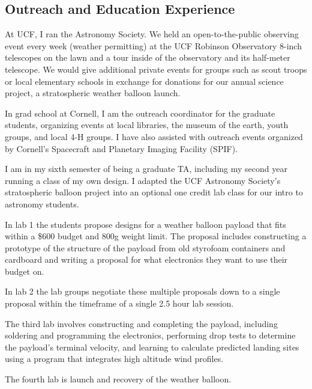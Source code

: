 \documentclass[preprint]{aastex}
\begin{document}
\begin{multicols}{2}
\vspace{-3mm}
\subsection*{Outreach and Education Experience}
\vspace{-3mm}

At UCF, I ran the Astronomy Society. We held an open-to-the-public observing
event every week (weather permitting) at the UCF Robinson Observatory 8-inch
telescopes on the lawn and a tour inside of the observatory and its half-meter
telescope. We would give additional private events for groups such as scout
troops or local elementary schools in exchange for donations for our annual
science project, a stratospheric weather balloon launch.

In grad school at Cornell, I am the outreach coordinator for the graduate
students, organizing events at local libraries, the museum of the earth,
youth groups, and local 4-H groups. I have also assisted with outreach events
organized by Cornell's Spacecraft and Planetary Imaging Facility (SPIF).

I am in my sixth semester of being a graduate TA, including my second year
running a class of my own design. I adapted the UCF Astronomy Society's
stratospheric balloon project into an optional one credit lab class for our
intro to astronomy students.

In lab 1 the students propose designs for a weather balloon payload that fits
within a \$600 budget and 800g weight limit. The proposal includes constructing
a prototype of the structure of the payload from old styrofoam containers and
cardboard and writing a proposal for what electronics they want to use their
budget on.

In lab 2 the lab groups negotiate these multiple proposals down to a single
proposal within the timeframe of a single 2.5 hour lab session.

The third lab involves constructing and completing the payload, including
soldering and programming the electronics, performing drop tests to
determine the payload's terminal velocity, and learning to calculate
predicted landing sites using a program that integrates high altitude wind profiles.

The fourth lab is launch and recovery of the weather balloon.

\end{multicols}
\end{document}
